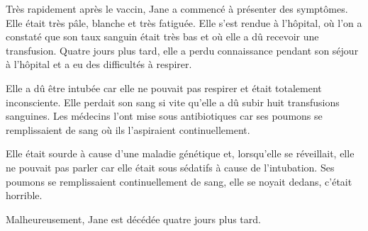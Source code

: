 Très rapidement après le vaccin, Jane a commencé à présenter des symptômes. Elle
était très pâle, blanche et très fatiguée. Elle s'est rendue à l'hôpital, où
l'on a constaté que son taux sanguin était très bas et où elle a dû recevoir une
transfusion. Quatre jours plus tard, elle a perdu connaissance pendant son
séjour à l'hôpital et a eu des difficultés à respirer.

Elle a dû être intubée car elle ne pouvait pas respirer et était totalement
inconsciente. Elle perdait son sang si vite qu'elle a dû subir huit transfusions
sanguines. Les médecins l'ont mise sous antibiotiques car ses poumons se
remplissaient de sang où ils l'aspiraient continuellement.

Elle était sourde à cause d'une maladie génétique et, lorsqu'elle se réveillait,
elle ne pouvait pas parler car elle était sous sédatifs à cause de
l'intubation. Ses poumons se remplissaient continuellement de sang, elle se
noyait dedans, c'était horrible.

Malheureusement, Jane est décédée quatre jours plus tard.


